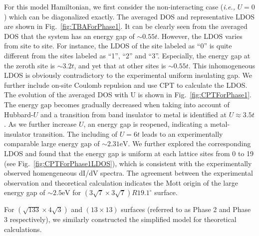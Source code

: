 \documentclass[aps,prb,reprint,amsfonts,amsmath,amssymb,showpacs,groupedaddress,superscriptaddress,onecolumn]{revtex4-1}
\begin{document}
For this model Hamiltonian, we first consider the non-interacting case (\textit{i.e.,} $U = 0$) which can be diagonalized exactly. The averaged DOS and representative LDOS are shown in Fig.~\ref{fig:TBAForPhase1}. It can be clearly seen from the averaged DOS that the system has an energy gap of $\sim 0.55t$. However, the LDOS varies from site to site. For instance, the LDOS of the site labeled as ``0'' is quite different from the sites labeled as ``1'', ``2'' and ``3''. Especially, the energy gap at the zeroth site is $\sim 3.2t$, and yet that at other sites is $\sim 0.55t$. This inhomogeneous LDOS is obviously contradictory to the experimental uniform insulating gap. We further include on-site Coulomb repulsion and use CPT to calculate the LDOS. The evolution of the averaged DOS with U is shown in Fig.~\ref{fig:CPTForPhase1}. The energy gap becomes gradually decreased when taking into account of Hubbard-$U$ and a transition from band insulator to metal is identified at $U \approx 3.5t$. As we further increase $U$, an energy gap is reopened, indicating a metal-insulator transition. The including of $U = 6t$ leads to an experimentally comparable large energy gap of $\sim 2.31\text{eV}$. We further explored the corresponding LDOS and found that the energy gap is uniform at each lattice sites from 0 to 19 (see Fig.~\ref{fig:CPTForPhase1LDOS}), which is consistent with the experimentally observed homengeneous dI/dV spectra. The agreement between the experimental observation and theoretical calculation indicates the Mott origin of the large energy gap of $\sim 2.5\text{eV}$ for $(3\sqrt{7} \times 3\sqrt{7})R19.1^\circ$ surface.

For $(\sqrt{133} \times 4\sqrt{3})$ and $(13 \times 13)$ surfaces (referred to as Phase 2 and Phase 3 respectively), we similarly constructed the simplified model for theoretical calculations.
\end{document}
